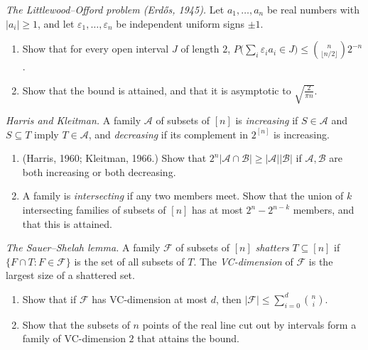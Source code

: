 \begin{exercise}[$\star\star$]\label{pb:littlewoodofford}
\emph{The Littlewood--Offord problem (Erdős, 1945).} Let $a_1,\dots,a_n$ be real numbers with $|a_i|\ge1$, and let $\varepsilon_1,\dots,\varepsilon_n$ be
independent uniform signs $\pm1$.
\begin{enumerate}[label=(\alph*)]
\item Show that for every open interval $J$ of length $2$, $P\bigl(\sum_i\varepsilon_ia_i\in J\bigr)\le\binom n{\lfloor n/2\rfloor}2^{-n}$.
\item Show that the bound is attained, and that it is asymptotic to $\sqrt{\frac2{\pi n}}$.
\end{enumerate}
\end{exercise}

\begin{exercise}[$\star\star$]\label{pb:kleitman}
\emph{Harris and Kleitman.} A family $\mathcal A$ of subsets of $[n]$ is \emph{increasing} if $S\in\mathcal A$ and $S\subseteq T$ imply $T\in\mathcal A$,
and \emph{decreasing} if its complement in $2^{[n]}$ is increasing.
\begin{enumerate}[label=(\alph*)]
\item (Harris, 1960; Kleitman, 1966.) Show that $2^n|\mathcal A\cap\mathcal B|\ge|\mathcal A||\mathcal B|$ if $\mathcal A,\mathcal B$ are both increasing or both decreasing.
\item A family is \emph{intersecting} if any two members meet. Show that the union of $k$ intersecting families of subsets of $[n]$ has
at most $2^n-2^{n-k}$ members, and that this is attained.
\end{enumerate}
\end{exercise}

\begin{exercise}[$\star\star$]\label{pb:sauer}
\emph{The Sauer--Shelah lemma.} A family $\mathcal F$ of subsets of $[n]$ \emph{shatters} $T\subseteq[n]$ if $\{F\cap T:F\in\mathcal F\}$ is the set of
all subsets of $T$. The \emph{VC-dimension} of $\mathcal F$ is the largest size of a shattered set.
\begin{enumerate}[label=(\alph*)]
\item Show that if $\mathcal F$ has VC-dimension at most $d$, then $|\mathcal F|\le\sum_{i=0}^d\binom ni$.
\item Show that the subsets of $n$ points of the real line cut out by intervals form a family of VC-dimension $2$ that attains the
bound.
\end{enumerate}
\end{exercise}

